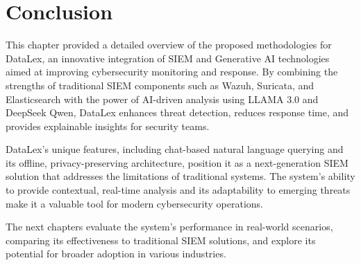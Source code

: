 \section{Conclusion}
\label{sec_conclusion_methodologies}

This chapter provided a detailed overview of the proposed methodologies for DataLex, an innovative integration of SIEM and Generative AI technologies aimed at improving cybersecurity monitoring and response. By combining the strengths of traditional SIEM components such as Wazuh, Suricata, and Elasticsearch with the power of AI-driven analysis using LLAMA 3.0 and DeepSeek Qwen, DataLex enhances threat detection, reduces response time, and provides explainable insights for security teams.

DataLex's unique features, including chat-based natural language querying and its offline, privacy-preserving architecture, position it as a next-generation SIEM solution that addresses the limitations of traditional systems. The system's ability to provide contextual, real-time analysis and its adaptability to emerging threats make it a valuable tool for modern cybersecurity operations.

The next chapters evaluate the system's performance in real-world scenarios, comparing its effectiveness to traditional SIEM solutions, and explore its potential for broader adoption in various industries.
